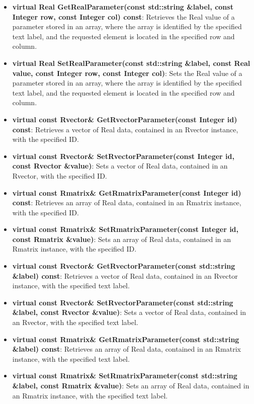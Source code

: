 \begin{itemize}
\item \textbf{virtual Real GetRealParameter(const std::string \&label, const Integer row,  const
Integer col) const}: Retrieves the Real value of a parameter stored in an array, where the array is
identified by the specified text label, and the requested element is located in the specified row
and column.
\item \textbf{virtual Real SetRealParameter(const std::string \&label, const Real value, const
Integer row, const Integer col)}: Sets the Real value of a parameter stored in an array, where the
array is identified by the specified text label, and the requested element is located in the
specified row and column.
\item \textbf{virtual const Rvector\& GetRvectorParameter(const Integer id) const}: Retrieves a
vector of Real data, contained in an Rvector instance, with the specified ID.
\item \textbf{virtual const Rvector\& SetRvectorParameter(const Integer id, const Rvector
\&value)}: Sets a vector of Real data, contained in an Rvector, with the specified ID.
\item \textbf{virtual const Rmatrix\& GetRmatrixParameter(const Integer id) const}: Retrieves an
array of Real data, contained in an Rmatrix instance, with the specified ID.
\item \textbf{virtual const Rmatrix\& SetRmatrixParameter(const Integer id, const Rmatrix
\&value)}: Sets an array of Real data, contained in an Rmatrix instance, with the specified ID.
\item \textbf{virtual const Rvector\& GetRvectorParameter(const std::string \&label) const}:
Retrieves a vector of Real data, contained in an Rvector instance, with the specified text label.
\item \textbf{virtual const Rvector\& SetRvectorParameter(const std::string \&label, const Rvector
\&value)}: Sets a vector of Real data, contained in an Rvector, with the specified text label.
\item \textbf{virtual const Rmatrix\& GetRmatrixParameter(const std::string \&label) const}:
Retrieves an array of Real data, contained in an Rmatrix instance, with the specified text label.
\item \textbf{virtual const Rmatrix\& SetRmatrixParameter(const std::string \&label, const Rmatrix
\&value)}: Sets an array of Real data, contained in an Rmatrix instance, with the specified text
label.
\end{itemize}

